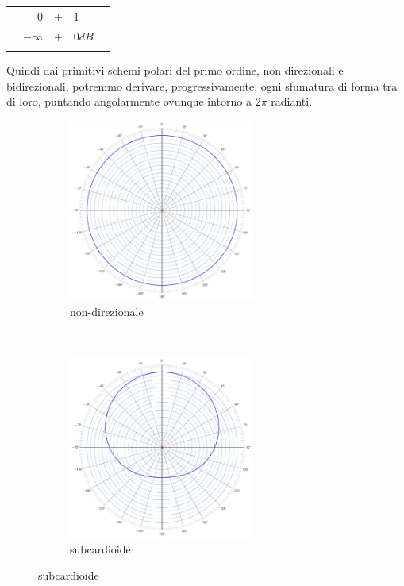 \begin{table}[ht]
\begin{center}
\begin{tabular}{rrcll}
                & $0$          & $+$ & $1$                  & \\
                & $-\infty$    & $+$ & $0dB$            & \\ %
& \\
\end{tabular}
\end{center}
\label{tab:polarcoef}
\end{table}

Quindi dai primitivi schemi polari del primo ordine, non direzionali e
bidirezionali, potremmo derivare, progressivamente, ogni sfumatura di forma tra
di loro, puntando angolarmente ovunque intorno a $2\pi$ radianti.

\begin{figure}[h]
    \centering
    \begin{subfigure}[t]{0.48\textwidth}
        \centering
        \includegraphics[height=6cm]{CAPITOLI/_TIKZ/POLAR/omni}
        \caption{non-direzionale}%
        \label{pol:omni-p}
    \end{subfigure}%
    ~
    \begin{subfigure}[t]{0.48\textwidth}
        \centering
        \includegraphics[height=6cm]{CAPITOLI/_TIKZ/POLAR/subcardioid}
        \caption{subcardioide}%

\end{subfigure}
\end{figure}
